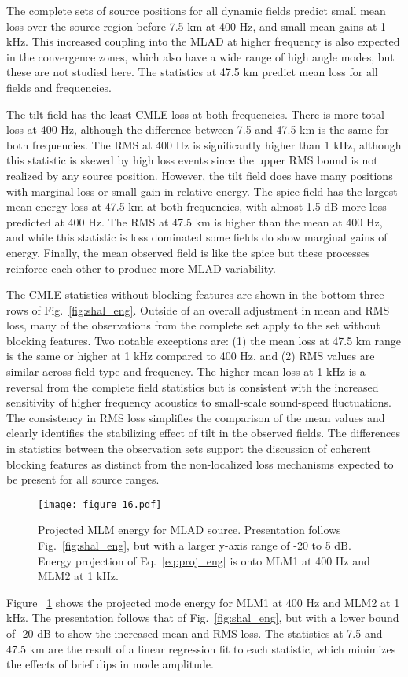 \documentclass[preprint,NumberedRefs]{JASA}
\begin{document}
The complete sets of source positions for all dynamic fields predict small mean loss over the source region before 7.5 km at 400 Hz, and small mean gains at 1 kHz. This increased coupling into the MLAD at higher frequency is also expected in the convergence zones, which also have a wide range of high angle modes, but these are not studied here. The statistics at 47.5 km predict mean loss for all fields and frequencies.

The tilt field has the least CMLE loss at both frequencies. There is more total loss at 400 Hz, although the difference between 7.5 and 47.5 km is the same for both frequencies. The RMS at 400 Hz is significantly higher than 1 kHz, although this statistic is skewed by high loss events since the upper RMS bound is not realized by any source position. However, the tilt field does have many positions with marginal loss or small gain in relative energy. The spice field has the largest mean energy loss at 47.5 km at both frequencies, with almost 1.5 dB more loss predicted at 400 Hz. The RMS at 47.5 km is higher than the mean at 400 Hz, and while this statistic is loss dominated some fields do show marginal gains of energy. Finally, the mean observed field is like the spice but these processes reinforce each other to produce more MLAD variability.

The CMLE statistics without blocking features are shown in the bottom three rows of Fig.~\ref{fig:shal_eng}. Outside of an overall adjustment in mean and RMS loss, many of the observations from the complete set apply to the set without blocking features. Two notable exceptions are: (1) the mean loss at 47.5 km range is the same or higher at 1 kHz compared to 400 Hz, and (2) RMS values are similar across field type and frequency. The higher mean loss at 1 kHz is a reversal from the complete field statistics but is consistent with the increased sensitivity of higher frequency acoustics to small-scale sound-speed fluctuations. The consistency in RMS loss simplifies the comparison of the mean values and clearly identifies the stabilizing effect of tilt in the observed fields. The differences in statistics between the observation sets support the discussion of coherent blocking features as distinct from the non-localized loss mechanisms expected to be present for all source ranges.

\begin{figure}
\texttt{[image: figure\_16.pdf]}
    \caption{Projected MLM energy for MLAD source. Presentation follows Fig.~\ref{fig:shal_eng}, but with a larger y-axis range of -20 to 5 dB. Energy projection of Eq.~\eqref{eq:proj_eng} is onto MLM1 at 400 Hz and MLM2 at 1 kHz.}
    \label{fig:shal_proj}
\end{figure}
Figure ~\ref{fig:shal_proj} shows the projected mode energy for MLM1 at 400 Hz and MLM2 at 1 kHz. The presentation follows that of Fig.~\ref{fig:shal_eng}, but with a lower bound of -20 dB to show the increased mean and RMS loss. The statistics at 7.5 and 47.5 km are the result of a linear regression fit to each statistic, which minimizes the effects of brief dips in mode amplitude.
\end{document}
